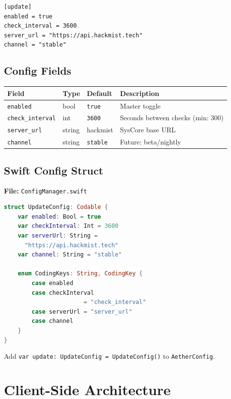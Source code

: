 \documentclass[11pt, a4paper]{article}
\newcommand{\inlinecode}[1]{\texttt{\small\colorbox{codebg}{#1}}}
\begin{document}
\begin{lstlisting}[title=TOML (~/.config/aether/config.toml)]
[update]
enabled = true
check_interval = 3600
server_url = "https://api.hackmist.tech"
channel = "stable"
\end{lstlisting}

\subsection{Config Fields}

\begin{tabularx}{\columnwidth}{lllX}
\toprule
\textbf{Field} & \textbf{Type} & \textbf{Default} & \textbf{Description} \\
\midrule
\texttt{enabled} & bool & \texttt{true} & Master toggle \\
\texttt{check\_interval} & int & \texttt{3600} & Seconds between checks (min: 300) \\
\texttt{server\_url} & string & hackmist & SysCore base URL \\
\texttt{channel} & string & \texttt{stable} & Future: beta/nightly \\
\bottomrule
\end{tabularx}

\subsection{Swift Config Struct}

\textbf{File:} \texttt{ConfigManager.swift}

\begin{lstlisting}[language=swift]
struct UpdateConfig: Codable {
    var enabled: Bool = true
    var checkInterval: Int = 3600
    var serverUrl: String =
      "https://api.hackmist.tech"
    var channel: String = "stable"

    enum CodingKeys: String, CodingKey {
        case enabled
        case checkInterval
                       = "check_interval"
        case serverUrl = "server_url"
        case channel
    }
}
\end{lstlisting}

Add \inlinecode{var update: UpdateConfig = UpdateConfig()} to \texttt{AetherConfig}.


\section{Client-Side Architecture}
\label{sec:client}
\end{document}
